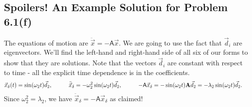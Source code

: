 \documentclass{article}
\begin{document}
\bigskip
\dphline
\bigskip
\subsection*{Spoilers!  An Example Solution for Problem 6.1(f)}

\color{spoilerwhite}
The equations of motion are $\ddot{\vec{x}} = -\mathsf{A}\vec{x}$.  We are going to use the fact that $\vec{d}_{i}$ are eigenvectors. 
We'll find the left-hand and right-hand side of all six of our 
forms to show that they are solutions.  Note that the vectors $\vec{d}_{i}$ are constant with respect to time - all the explicit time dependence is in the coefficients.
	\begin{alignat*}{5}
		\vec{x}_{\delta}(t) &= \sin(\omega_{2}t)\vec{d}_{2},
			&\qquad	\ddot{\vec{x}}_{\delta} &= -\omega_{2}^{2}\sin(\omega_{2}t)\vec{d}_{2},
			&\qquad	-\mathsf{A}\vec{x}_{\delta} &= -\sin(\omega_{2}t){\bf{A}}\vec{d}_{2} = -\lambda_{2}\sin(\omega_{2}t)\vec{d}_{2}.
	\end{alignat*}
Since $\omega_{2}^{2} = \lambda_{2}$, we have $\ddot{\vec{x}}_{\delta} = -\mathsf{A}\vec{x}_{\delta}$ as claimed!
\color{black}

\endofhomework
\addfooter
\end{document}

